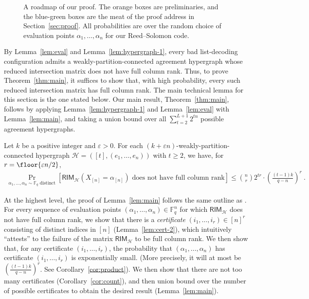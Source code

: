 \documentclass{article}[11pt]
\begin{document}
\begin{figure}

\caption{
A roadmap of our proof. The orange boxes are preliminaries, and the blue-green boxes are the meat of the proof address in Section~\ref{sec:proof}. All probabilities are over the random choice of evaluation points $\alpha_1,\dots,\alpha_n$ for our Reed--Solomon code.
}\label{fig:roadmap}
\end{figure}



By Lemma~\ref{lem:eval} and Lemma~\ref{lem:hypergraph-1}, every bad list-decoding configuration admits a weakly-partition-connected agreement hypergraph whose reduced intersection matrix does not have full column rank. 
Thus, to prove Theorem~\ref{thm:main}, it suffices to show that, with high probability, every such reduced intersection matrix has full column rank.
The main technical lemma for this section is the one stated below.
Our main result, Theorem~\ref{thm:main}, follows by applying Lemma~\ref{lem:hypergraph-1} and Lemma~\ref{lem:eval} with Lemma~\ref{lem:main}, and taking a union bound over all $\sum_{t=2}^{L+1}{2^{tn}}$ possible agreement hypergraphs.
\begin{lemma}
  Let $k$ be a positive integer and $\varepsilon>0$.
  For each $(k+\varepsilon n)$-weakly-partition-connected hypergraph $\mathcal{H}=([t],(e_1,\dots,e_n))$ with $t \ge 2$, we have, for $r=\floor{\varepsilon n/2}$,
  \begin{align}
    \Pr_{\alpha_1,\dots,\alpha_n \sim \mathbb{F}_q\text{ distinct}} \left[ \mathsf{RIM}_{\mathcal{H}}(X_{[n]}=\alpha_{[n]})\text{ does not have full column rank} \right] \le \binom{n}{r}2^{tr}\cdot \left(\frac{(t-1)k}{q-n}\right)^r \ .
    \label{}
  \end{align}
  \label{lem:main}
\end{lemma}

At the highest level, the proof of Lemma~\ref{lem:main} follows the same outline as \cite{GZ23}.
For every sequence of evaluation points $(\alpha_1,\dots,\alpha_n) \in \mathbb{F}_q^n$ for which $\mathsf{RIM}_{\mathcal{H}}$ does not have full column rank, we show that there is a \emph{certificate} $(i_1,\dots,i_r) \in [n]^r$ consisting of distinct indices in $[n]$ (Lemma~\ref{lem:cert-2}), which intuitively ``attests'' to the failure of the matrix $\mathsf{RIM}_\mathcal{H}$ to be full column rank.
We then show that, for any certificate $(i_1,\dots,i_r)$, the probability that $(\alpha_1,\dots,\alpha_n)$ has certificate $(i_1,\dots,i_r)$ is exponentially small. (More precisely, it will at most be $(\frac{(t-1)k}{q-n})^r$. See Corollary~\ref{cor:product}).
We then show that there are not too many certificates (Corollary~\ref{cor:count}), and then union bound over the number of possible certificates to obtain the desired result (Lemma~\ref{lem:main}).
\end{document}
